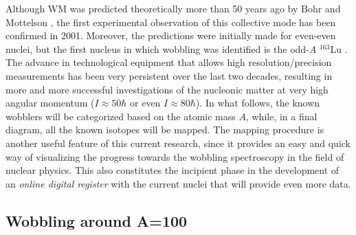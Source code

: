 Although WM was predicted theoretically more than 50 years ago by Bohr and Mottelson \cite{bohr1998nuclear}, the first experimental observation of this collective mode has been confirmed in 2001. Moreover, the predictions were initially made for even-even nuclei, but the first nucleus in which wobbling was identified is the odd-$A$ $^{163}$Lu \cite{odegaard2001evidence}. The advance in technological equipment that allows high resolution/precision measurements has been very persistent over the last two decades, resulting in more and more successful investigations of the nucleonic matter at very high angular momentum ($I\approx 50\hbar$ or even $I\approx 80\hbar$). In what follows, the known wobblers will be categorized based on the atomic mass $A$, while, in a final diagram, all the known isotopes will be mapped. The mapping procedure is another useful feature of this current research, since it provides an easy and quick way of visualizing the progress towards the wobbling spectroscopy in the field of nuclear physics. This also constitutes the incipient phase in the development of an \emph{online digital register} with the current nuclei that will provide even more data.

\subsection{Wobbling around A=100}

